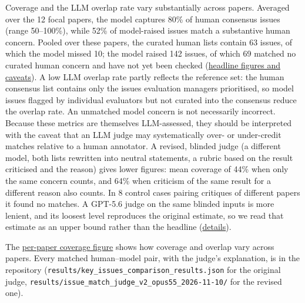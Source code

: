 \documentclass[
  11pt,
  letterpaper,
]{article}
\begin{document}
Coverage and the LLM overlap rate vary substantially across papers.
Averaged over the 12 focal papers, the model captures 80\% of human
consensus issues (range 50--100\%), while 52\% of model-raised issues
match a substantive human concern. Pooled over these papers, the curated
human lists contain 63 issues, of which the model missed 10; the model
raised 142 issues, of which 69 matched no curated human concern and have
not yet been checked (\hyperref[critique-headline]{headline figures and
caveats}). A low LLM overlap rate partly reflects the reference set: the
human consensus list contains only the issues evaluation managers
prioritised, so model issues flagged by individual evaluators but not
curated into the consensus reduce the overlap rate. An unmatched model
concern is not necessarily incorrect. Because these metrics are
themselves LLM-assessed, they should be interpreted with the caveat that
an LLM judge may systematically over- or under-credit matches relative
to a human annotator. A revised, blinded judge (a different model, both
lists rewritten into neutral statements, a rubric based on the result
criticised and the reason) gives lower figures: mean coverage of 44\%
when only the same concern counts, and 64\% when criticism of the same
result for a different reason also counts. In 8 control cases pairing
critiques of different papers it found no matches. A GPT-5.6 judge on
the same blinded inputs is more lenient, and its loosest level
reproduces the original estimate, so we read that estimate as an upper
bound rather than the headline (\hyperref[critique-headline]{details}).

\begin{tcolorbox}[enhanced jigsaw, colframe=quarto-callout-tip-color-frame, breakable, rightrule=.15mm, toptitle=1mm, opacitybacktitle=0.6, opacityback=0, colback=white, bottomtitle=1mm, leftrule=.75mm, toprule=.15mm, coltitle=black, bottomrule=.15mm, titlerule=0mm, title=\textcolor{quarto-callout-tip-color}{\faLightbulb}\hspace{0.5em}{Examine what was found and missed}, colbacktitle=quarto-callout-tip-color!10!white, arc=.35mm, left=2mm]

The \hyperref[fig-coverage-precision]{per-paper coverage figure} shows
how coverage and overlap vary across papers. Every matched human--model
pair, with the judge's explanation, is in the repository
(\texttt{results/key\_issues\_comparison\_results.json} for the original
judge, \texttt{results/issue\_match\_judge\_v2\_opus55\_2026-11-10/} for
the revised one).

\end{tcolorbox}
\end{document}
